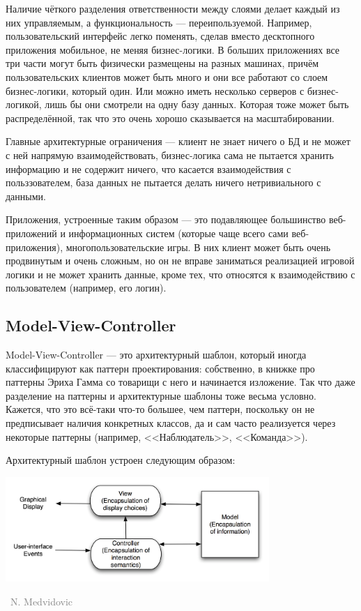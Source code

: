 \documentclass[a5paper]{article}
\newcommand{\attribution}[1] {
    \vspace{-4mm}\begin{flushright}\begin{scriptsize}\textcolor{gray}
    {\textcopyright\, #1}\end{scriptsize}\end{flushright}
}
\begin{document}
Наличие чёткого разделения ответственности между слоями делает каждый из них управляемым, а функциональность --- переипользуемой. Например, пользовательский интерфейс легко поменять, сделав вместо десктопного приложения мобильное, не меняя бизнес-логики. В больших приложениях все три части могут быть физически размещены на разных машинах, причём пользовательских клиентов может быть много и они все работают со слоем бизнес-логики, который один. Или можно иметь несколько серверов с бизнес-логикой, лишь бы они смотрели на одну базу данных. Которая тоже может быть распределённой, так что это очень хорошо сказывается на масштабировании. 

Главные архитектурные ограничения --- клиент не знает ничего о БД и не может с ней напрямую взаимодействовать, бизнес-логика сама не пытается хранить информацию и не содержит ничего, что касается взаимодействия с польззователем, база данных не пытается делать ничего нетривиального с данными. 

Приложения, устроенные таким образом --- это подавляющее большинство веб-приложений и информационных систем (которые чаще всего сами веб-приложения), многопользовательские игры. В них клиент может быть очень продвинутым и очень сложным, но он не вправе заниматься реализацией игровой логики и не может хранить данные, кроме тех, что относятся к взаимодействию с пользователем (например, его логин).

\subsection{Model-View-Controller}

Model-View-Controller --- это архитектурный шаблон, который иногда классифицируют как паттерн проектирования: собственно, в книжке про паттерны Эриха Гамма со товарищи с него и начинается изложение. Так что даже разделение на паттерны и архитектурные шаблоны тоже весьма условно. Кажется, что это всё-таки что-то большее, чем паттерн, поскольку он не предписывает наличия конкретных классов, да и сам часто реализуется через некоторые паттерны (например, <<Наблюдатель>>, <<Команда>>).

Архитектурный шаблон устроен следующим образом:

\begin{center}
    \includegraphics[width=0.75\textwidth]{mvc.png}
    \attribution{N. Medvidovic}
\end{center}
\end{document}
